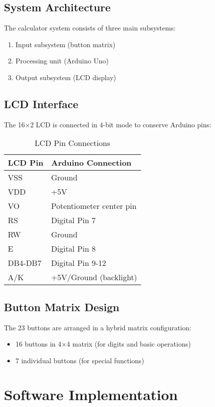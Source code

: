 \documentclass[journal]{IEEEtran}
\begin{document}
\subsection{System Architecture}
The calculator system consists of three main subsystems:
\begin{enumerate}
    \item Input subsystem (button matrix)
    \item Processing unit (Arduino Uno)
    \item Output subsystem (LCD display)
\end{enumerate}

\subsection{LCD Interface}
The 16×2 LCD is connected in 4-bit mode to conserve Arduino pins:
\begin{table}[H]
\centering
\caption{LCD Pin Connections}
\begin{tabular}{|l|l|}
\hline
\textbf{LCD Pin} & \textbf{Arduino Connection} \\ \hline
VSS & Ground \\ \hline
VDD & +5V \\ \hline
VO & Potentiometer center pin \\ \hline
RS & Digital Pin 7 \\ \hline
RW & Ground \\ \hline
E & Digital Pin 8 \\ \hline
DB4-DB7 & Digital Pin 9-12 \\ \hline
A/K & +5V/Ground (backlight) \\ \hline
\end{tabular}
\end{table}

\subsection{Button Matrix Design}
The 23 buttons are arranged in a hybrid matrix configuration:
\begin{itemize}
    \item 16 buttons in 4×4 matrix (for digits and basic operations)
    \item 7 individual buttons (for special functions)
\end{itemize}

\section{Software Implementation}
\end{document}
